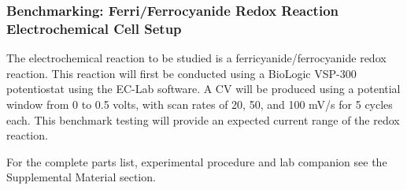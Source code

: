 \documentclass{article}
\begin{document}
\subsubsection*{Benchmarking: Ferri/Ferrocyanide Redox Reaction Electrochemical Cell Setup}

The electrochemical reaction to be studied is a ferricyanide/ferrocyanide redox reaction. This reaction will first be conducted using a BioLogic VSP-300 potentiostat using the EC-Lab software. A CV will be produced using a potential window from 0 to 0.5 volts, with scan rates of 20, 50, and 100 mV/s for 5 cycles each. This benchmark testing will provide an expected current range of the redox reaction. 

For the complete parts list, experimental procedure and lab companion see the Supplemental Material section.
\end{document}
